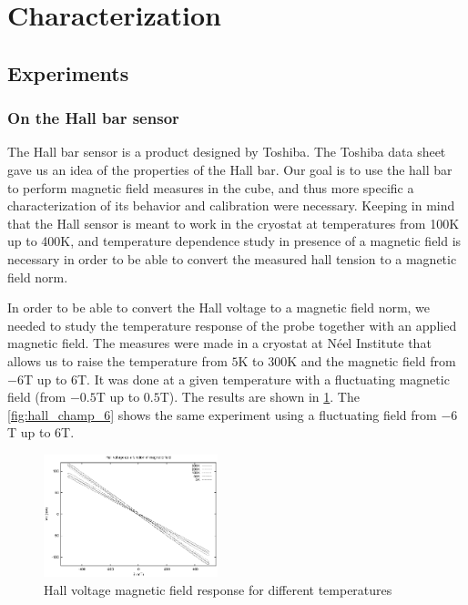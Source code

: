 \documentclass[journal,a4paper]{IEEEtran}
\begin{document}
\section{Characterization}

\subsection{Experiments}


\subsubsection{On the Hall bar sensor}
The Hall bar sensor is a product designed by Toshiba. The Toshiba data sheet \cite{toshiba} gave us an idea of the properties of the Hall bar. Our goal is to use the hall bar to perform magnetic field measures in the cube, and thus more specific a characterization of its behavior and calibration were necessary. Keeping in mind that the Hall sensor is meant to work in the cryostat at temperatures from 100K up to 400K, and temperature dependence study  in presence of a magnetic field is necessary in order to be able to convert the measured hall tension to a magnetic field norm.

In order to be able to convert the Hall voltage to a magnetic field norm, we needed to study the temperature response of the probe together with an applied magnetic field. The measures were made in a cryostat at Néel Institute that allows us to raise the temperature from $5$K to $300$K and the magnetic field from $-6$T up to $6$T. It was done at a given temperature with a fluctuating magnetic field (from $-0.5$T up to $0.5$T). The results are shown in \figurename \ref{fig:hall_champ}. The \figurename \ref{fig:hall_champ_6} shows the same experiment using a fluctuating field from $-6$T up to $6$T.

\begin{figure}[h]
\centering
\includegraphics[width=0.45\textwidth]{tension_hall_fonction_champ.eps}
\caption{Hall voltage magnetic field response for different temperatures}
\label{fig:hall_champ}
\end{figure}
\end{document}
